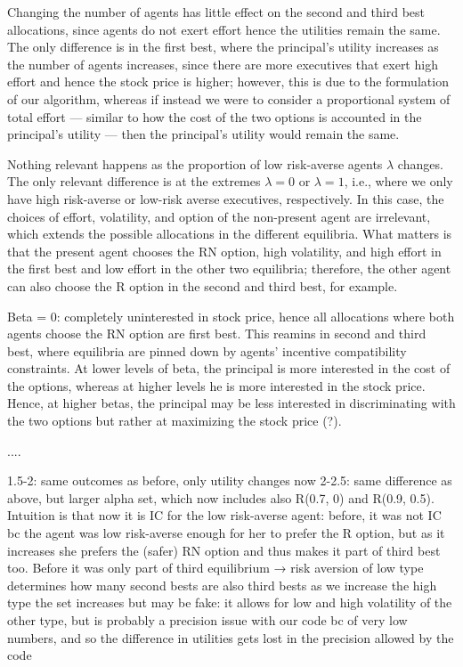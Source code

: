 Changing the number of agents has little effect on the second and third best allocations, since agents do not exert effort hence the utilities remain the same. The only difference is in the first best, where the principal's utility increases as the number of agents increases, since there are more executives that exert high effort and hence the stock price is higher; however, this is due to the formulation of our algorithm, whereas if instead we were to consider a proportional system of total effort --- similar to how the cost of the two options is accounted in the principal's utility --- then the principal's utility would remain the same.

Nothing relevant happens as the proportion of low risk-averse agents $\lambda$ changes. The only relevant difference is at the extremes $\lambda = 0$ or $\lambda = 1$, i.e., where we only have high risk-averse or low-risk averse executives, respectively. In this case, the choices of effort, volatility, and option of the non-present agent are irrelevant, which extends the possible allocations in the different equilibria. What matters is that the present agent chooses the RN option, high volatility, and high effort in the first best and low effort in the other two equilibria; therefore, the other agent can also choose the R option in the second and third best, for example.  

Beta = 0: completely uninterested in stock price, hence all allocations where both agents choose the RN option are first best. This reamins in second and third best, where equilibria are pinned down by agents' incentive compatibility constraints. 
At lower levels of beta, the principal is more interested in the cost of the options, whereas at higher levels he is more interested in the stock price. Hence, at higher betas, the principal may be less interested in discriminating with the two options but rather at maximizing the stock price (?).


....



1.5-2: same outcomes as before, only utility changes now
2-2.5: same difference as above, but larger alpha set, which now includes also R(0.7, 0) and R(0.9, 0.5). Intuition is that now it is IC for the low risk-averse agent: before, it was not IC bc the agent was low risk-averse enough for her to prefer the R option, but as it increases she prefers the (safer) RN option and thus makes it part of third best too. Before it was only part of third equilibrium
→ risk aversion of low type determines how many second bests are also third bests
as we increase the high type the set increases but may be fake: it allows for low and high volatility of the other type, but is probably a precision issue with our code bc of very low numbers, and so the difference in utilities gets lost in the precision allowed by the code

